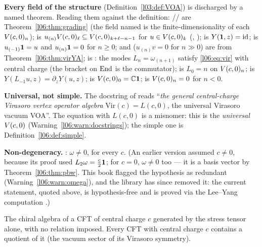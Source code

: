 \begin{dictionary}
\textbf{Every field of the structure}  (Definition~\ref{l03:def:VOA}) is
discharged by a named theorem. Reading them against the definition: //
 are Theorem~\ref{l06:thm:grading} (the field named  is the
finite-dimensionality of each $V(c,0)_n$);  is $u_{(n)}V(c,0)_\ell\subseteq
V(c,0)_{k+\ell-n-1}$ for $u\in V(c,0)_k$ (, );
 is $Y(\mathbf{1},z) = \mathrm{id}$;  is $u_{(-1)}\mathbf{1} = u$ and $u_{(n)}\mathbf{1} = 0$
for $n\ge0$;  and  ($u_{(n)}v = 0$ for $n\gg0$) are from
Theorem~\ref{l06:thm:virYA};  is : the modes
$L_n = \omega_{(n+1)}$ satisfy \eqref{l06:eq:vir} with central charge  (the bracket 
on $\operatorname{End}$ is the commutator);  is $L_0 = n$ on $V(c,0)_n$;  is
$Y(L_{-1}u,z) = \partial_zY(u,z)$;  is $V(c,0)_0 = {\mathbb{C}}\mathbf{1}$;  is
$V(c,0)_n = 0$ for $n<0$.

\textbf{Universal, not simple.} The docstring of  reads ``\emph{the general
central-charge Virasoro vertex operator algebra} $\mathrm{Vir}(c) = L(c,0)$, the universal Virasoro vacuum
VOA''. The equation with $L(c,0)$ is a misnomer: this is the \emph{universal} $V(c,0)$
(Warning~\ref{l06:warn:docstrings}); the simple one is Definition~\ref{l06:def:simple}.

\textbf{Non-degeneracy.} : $\omega\ne0$, for every $c$. (An earlier version assumed
$c\ne0$, because its proof used $L_2\omega = \frac c2\mathbf{1}$; for $c = 0$, $\omega\ne0$ too --- it is a basis
vector by Theorem~\ref{l06:thm:pbw}. This book flagged the hypothesis as redundant (Warning~\ref{l06:warn:omega}), and the library has
since removed it: the current statement, quoted above, is hypothesis-free and is proved via the Lee--Yang
computation .)
\end{dictionary}

\begin{physics}
The chiral algebra of a CFT of central charge $c$ generated by the stress tensor alone, with no relation
imposed. Every CFT with central charge $c$ contains a quotient of it (the vacuum sector of its Virasoro
symmetry).
\end{physics}

